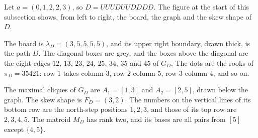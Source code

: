 \begin{example*}\label{dyckPathRunningExample}
Let $a=(0,1,2,2,3)$, so $D=UUUDUUDDDD$.  The figure at the start of this
subsection shows, from left to right, the board, the graph and the skew shape
of $D$.

The board is $\lambda_D=(3,5,5,5,5)$, and its upper right boundary, drawn
thick, is the path $D$.  The diagonal boxes are grey, and the boxes above the
diagonal are the eight edges $12$, $13$, $23$, $24$, $25$, $34$, $35$ and $45$
of $G_D$.  The dots are the rooks of $\pi_D=35421$: row $1$ takes column $3$,
row $2$ column $5$, row $3$ column $4$, and so on.

The maximal cliques of $G_D$ are $A_1=[1,3]$ and $A_2=[2,5]$, drawn below
the graph.  The skew shape is $F_D=(3,2)$.  The
numbers on the vertical lines of its bottom row are the north-step positions
$1,2,3$, and those of its top row are $2,3,4,5$.  The matroid $M_D$ has rank
two, and its bases are all pairs from $[5]$ except $\{4,5\}$.
\end{example*}

